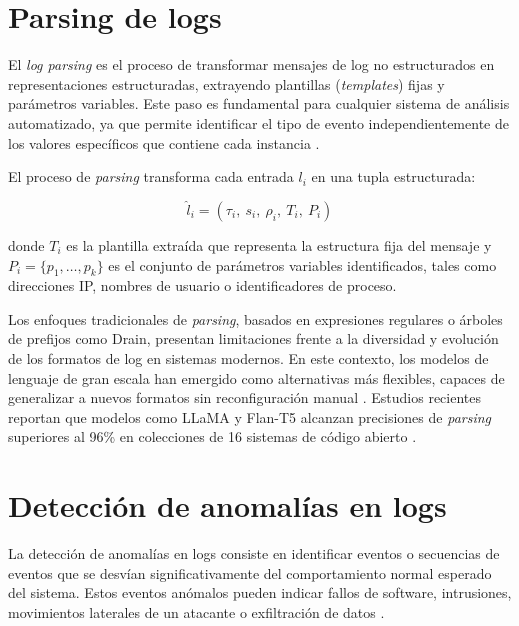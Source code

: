 \section{Parsing de logs}

El \textit{log parsing} es el proceso de transformar mensajes de log no estructurados en representaciones estructuradas, extrayendo plantillas (\textit{templates}) fijas y parámetros variables. Este paso es fundamental para cualquier sistema de análisis automatizado, ya que permite identificar el tipo de evento independientemente de los valores específicos que contiene cada instancia \cite{ma2024llmparser}.

El proceso de \textit{parsing} transforma cada entrada $l_i$ en una tupla estructurada:

\begin{equation}
    \hat{l}_i = (\tau_i,\ s_i,\ \rho_i,\ T_i,\ P_i)
\end{equation}

\noindent donde $T_i$ es la plantilla extraída que representa la estructura fija del mensaje y $P_i = \{p_1, \ldots, p_k\}$ es el conjunto de parámetros variables identificados, tales como direcciones IP, nombres de usuario o identificadores de proceso.

Los enfoques tradicionales de \textit{parsing}, basados en expresiones regulares o árboles de prefijos como Drain, presentan limitaciones frente a la diversidad y evolución de los formatos de log en sistemas modernos. En este contexto, los modelos de lenguaje de gran escala han emergido como alternativas más flexibles, capaces de generalizar a nuevos formatos sin reconfiguración manual \cite{ma2024llmparser, liu2025librelog}. Estudios recientes reportan que modelos como LLaMA y Flan-T5 alcanzan precisiones de \textit{parsing} superiores al 96\% en colecciones de 16 sistemas de código abierto \cite{ma2024llmparser}.

\section{Detección de anomalías en logs}

La detección de anomalías en logs consiste en identificar eventos o secuencias de eventos que se desvían significativamente del comportamiento normal esperado del sistema. Estos eventos anómalos pueden indicar fallos de software, intrusiones, movimientos laterales de un atacante o exfiltración de datos \cite{almodovar2024logfit}.

